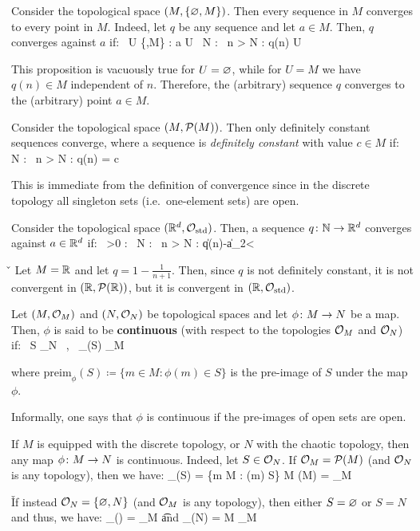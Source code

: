 Consider the topological space $(M,\{\varnothing,M\})$. Then every sequence in $M$ converges to every point in $M$. Indeed,
let $q$ be any sequence and let $a \in M$. Then, $q$ converges against $a$ if:
\bse
\forall \, U \in \{\vn,M\} : a \in U \imp \exists \, N \in \N : \forall \, n > N : q(n) \in U
\ese

This proposition is vacuously true for $U=\varnothing$, while for $U=M$ we have $q (n)\in M$ independent of $n$. Therefore,
the (arbitrary) sequence $q$ converges to the (arbitrary) point $a\in M$.
\ee

\be
Consider the topological space $(M,\mathcal{P}(M))$. Then only definitely constant sequences converge, where a sequence is
\emph{definitely constant} with value $c\in M$ if:
\bse
\exists \, N \in \N : \forall \, n > N : q(n) = c
\ese

This is immediate from the definition of convergence since in the discrete topology all singleton sets (i.e.\
one-element sets) are open.
\ee

\be
Consider the topological space $(\mathbb{R}^d,\mathcal{O}_\mathrm{std})$. Then, a sequence $q\colon \mathbb{N} \to \mathbb{R}^d$ converges against $a\in
\mathbb{R}^d$ if:
\bse
\forall\, \ve >0 : \exists \, N \in \N : \forall \, n > N : \|q(n)-a\|_2<\ve
\ese
\ee

\v

\be
Let $M=\mathbb{R}$ and let $q=1-\frac{1}{n+1}$. Then, since $q$ is not definitely constant, it is not convergent in $(\mathbb{R},\mathcal{P}
(\mathbb{R}))$, but it is convergent in $(\mathbb{R},\mathcal{O}_\mathrm{std})$.
\ee

\bd [Continuity]
Let $(M,\mathcal{O}_M)$ and $(N,\mathcal{O}_N)$ be topological spaces and let $\phi\colon M\to N$ be a map. Then, $\phi$ is said to be
\textbf{continuous} (with respect to the topologies $\mathcal{O}_M$ and $\mathcal{O}_N$) if:
\bse
\forall \, S \in \cO_N \, , \ _\phi(S) \in \cO_M
\ese

where $\mathrm{preim}_\phi(S) \coloneqq \{m \in M : \phi(m) \in S\}$ is the pre-image of $S$ under the map $\phi$.
\ed

Informally, one says that $\phi$ is continuous if the pre-images of open sets are open.

\be
If $M$ is equipped with the discrete topology, or $N$ with the chaotic topology, then any map $\phi\colon M \to N$ is
continuous. Indeed, let $S \in \mathcal{O}_N$. If $\mathcal{O}_M=\mathcal{P}(M)$ (and $\mathcal{O}_N$ is any topology), then we have:
\bse
{}_\phi(S) = \{m \in M : \phi(m) \in S\} \se M \in \cP(M) = \cO_M
\ese

\v

If instead $\mathcal{O}_N=\{\varnothing,N\}$ (and $\mathcal{O}_M$ is any topology), then either $S=\varnothing$ or $S=N$ and thus, we have:
\bse
{}_\phi(\vn) = \vn \in \cO_M \quad \t{and} \quad {}_\phi(N) = M \in \cO_M
\ese
\ee

